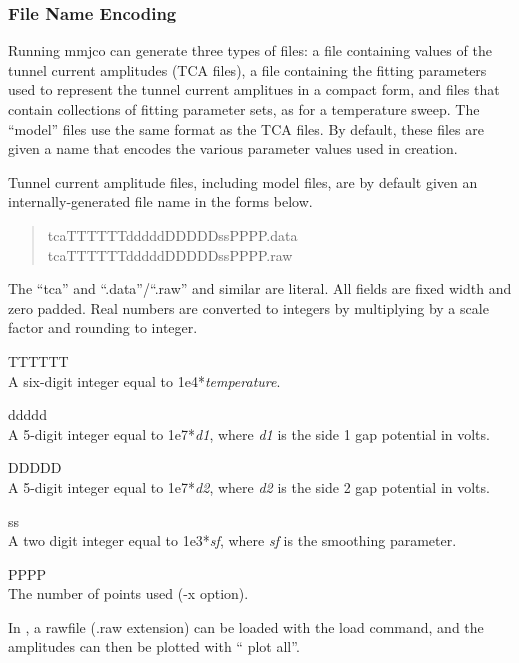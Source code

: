 \subsubsection{File Name Encoding}

Running {\vt mmjco} can generate three types of files:  a file
containing values of the tunnel current amplitudes (TCA files), a file
containing the fitting parameters used to represent the tunnel current
amplitues in a compact form, and files that contain collections of
fitting parameter sets, as for a temperature sweep.  The ``model''
files use the same format as the TCA files.  By default, these files
are given a name that encodes the various parameter values used in
creation.

Tunnel current amplitude files, including model files, are by default
given an internally-generated file name in the forms below.
\begin{quote}\vt
tcaTTTTTTdddddDDDDDssPPPP.data\\
tcaTTTTTTdddddDDDDDssPPPP.raw
\end{quote}

The ``{\vt tca}'' and ``{\vt .data}''/``{\vt .raw}'' and similar are
literal.  All fields are fixed width and zero padded.  Real numbers
are converted to integers by multiplying by a scale factor and
rounding to integer.

\begin{description}
\item{{\vt TTTTTT}\\
A six-digit integer equal to 1e4*{\it temperature\/}.}
\item{{\vt ddddd}\\
A 5-digit integer equal to 1e7*{\it d1\/}, where {\it d1} is the
 side 1 gap potential in volts.}
\item{{\vt DDDDD}\\
A 5-digit integer equal to 1e7*{\it d2\/}, where {\it d2} is the
 side 2 gap potential in volts.}
\item{{\vt ss}\\
A two digit integer equal to 1e3*{\it sf\/}, where {\it sf} is the
 smoothing parameter.}
\item{{\vt PPPP}\\
The number of points used ({\vt -x} option).}
\end{description}

In {\WRspice}, a rawfile ({\vt .raw} extension) can be loaded with the
{\et load} command, and the amplitudes can then be plotted with ``{\vt
plot all}''.

